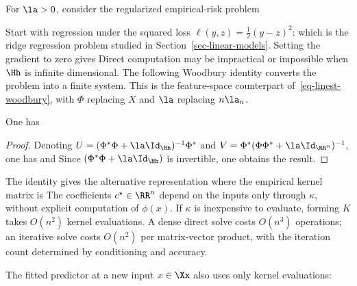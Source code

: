 For $\la>0$, consider the regularized empirical-risk problem

Start with regression under the squared loss $\ell(y,z)=\frac{1}{2}(y-z)^2$:
which is the ridge regression problem studied in Section~\ref{sec-linear-models}. 
%
Setting the gradient to zero gives
Direct computation may be impractical or impossible when $\Hh$ is infinite dimensional. The following Woodbury identity converts the problem into a finite system.
%
This is the feature-space counterpart of~\eqref{eq-linest-woodbury}, with $\Phi$ replacing $X$ and $\la$ replacing $n\la_n$.

\begin{prop}
	One has
\end{prop}
\begin{proof}
	Denoting $U=( \Phi^*\Phi + \la \Id_{\Hh} )^{-1} \Phi^*$ and $V=\Phi^* ( \Phi \Phi^* + \la \Id_{\RR^n} )^{-1}$, one has
	and
	Since $( \Phi^*\Phi + \la \Id_{\Hh} )$ is invertible, one obtains the result. 
\end{proof}

The identity gives the alternative representation
where the empirical kernel matrix is
The coefficients $c^\star \in \RR^n$ depend on the inputs only through $\kappa$, without explicit computation of $\phi(x)$. If $\kappa$ is inexpensive to evaluate, forming $K$ takes $O(n^2)$ kernel evaluations. A dense direct solve costs $O(n^3)$ operations; an iterative solve costs $O(n^2)$ per matrix-vector product, with the iteration count determined by conditioning and accuracy.

The fitted predictor at a new input $x \in \Xx$ also uses only kernel evaluations:

